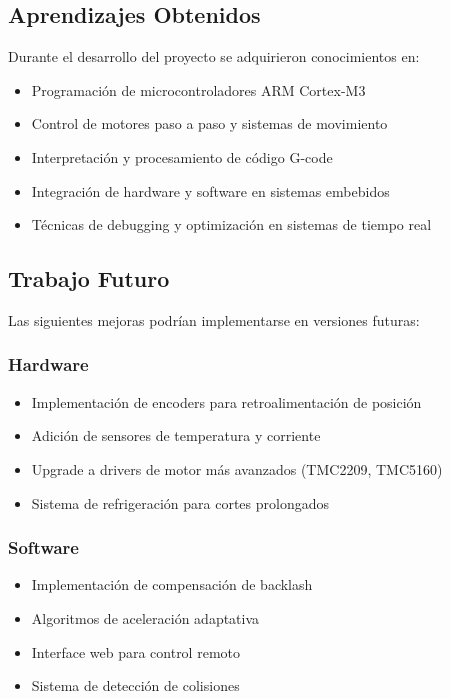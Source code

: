 \documentclass[12pt]{article}
\begin{document}
\subsection{Aprendizajes Obtenidos}

Durante el desarrollo del proyecto se adquirieron conocimientos en:
\begin{itemize}
    \item Programación de microcontroladores ARM Cortex-M3
    \item Control de motores paso a paso y sistemas de movimiento
    \item Interpretación y procesamiento de código G-code
    \item Integración de hardware y software en sistemas embebidos
    \item Técnicas de debugging y optimización en sistemas de tiempo real
\end{itemize}

\subsection{Trabajo Futuro}

Las siguientes mejoras podrían implementarse en versiones futuras:

\subsubsection{Hardware}
\begin{itemize}
    \item Implementación de encoders para retroalimentación de posición
    \item Adición de sensores de temperatura y corriente
    \item Upgrade a drivers de motor más avanzados (TMC2209, TMC5160)
    \item Sistema de refrigeración para cortes prolongados
\end{itemize}

\subsubsection{Software}
\begin{itemize}
    \item Implementación de compensación de backlash
    \item Algoritmos de aceleración adaptativa
    \item Interface web para control remoto
    \item Sistema de detección de colisiones
\end{itemize}
\end{document}
